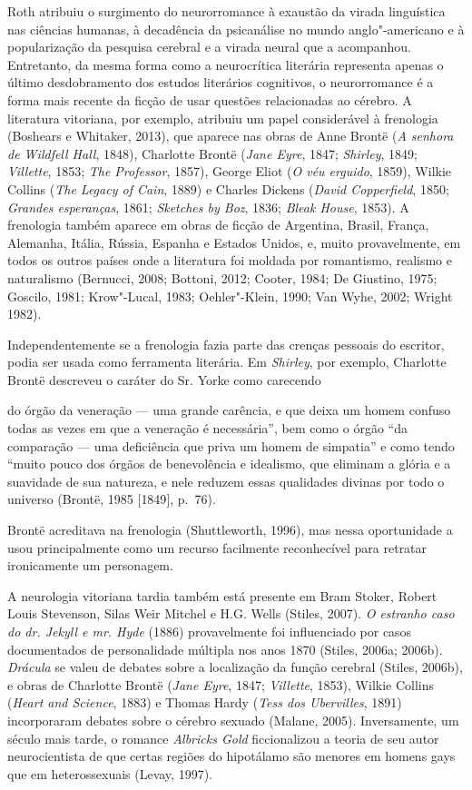 Roth atribuiu o surgimento do neurorromance à exaustão da virada
linguística nas ciências humanas, à decadência da psicanálise no mundo
anglo"-americano e à popularização da pesquisa cerebral e a virada neural
que a acompanhou. Entretanto, da mesma forma como a neurocrítica
literária representa apenas o último desdobramento dos estudos
literários cognitivos, o neurorromance é a forma mais recente da ficção
de usar questões relacionadas ao cérebro. A literatura vitoriana, por
exemplo, atribuiu um papel considerável à frenologia (Boshears e
Whitaker, 2013), que aparece nas obras de Anne Brontë (\emph{A senhora
de Wildfell Hall}, 1848), Charlotte Brontë (\emph{Jane Eyre}, 1847;
\emph{Shirley}, 1849; \emph{Villette}, 1853; \emph{The Professor},
1857), George Eliot (\emph{O véu erguido}, 1859), Wilkie Collins
(\emph{The Legacy of Cain}, 1889) e Charles Dickens (\emph{David
Copperfield}, 1850; \emph{Grandes esperanças}, 1861; \emph{Sketches by
Boz}, 1836; \emph{Bleak House}, 1853). A frenologia também aparece em
obras de ficção de Argentina, Brasil, França, Alemanha, Itália, Rússia,
Espanha e Estados Unidos, e, muito provavelmente, em todos os outros
países onde a literatura foi moldada por romantismo, realismo e
naturalismo (Bernucci, 2008; Bottoni, 2012; Cooter, 1984; De Giustino,
1975; Goscilo, 1981; Krow"-Lucal, 1983; Oehler"-Klein, 1990; Van Wyhe,
2002; Wright 1982).

Independentemente se a frenologia fazia parte das crenças pessoais do
escritor, podia ser usada como ferramenta literária. Em \emph{Shirley},
por exemplo, Charlotte Brontë descreveu o caráter do Sr. Yorke como
carecendo

do órgão da veneração --- uma grande carência, e que deixa um homem
confuso todas as vezes em que a veneração é necessária'', bem como o
órgão ``da comparação --- uma deficiência que priva um homem de
simpatia'' e como tendo ``muito pouco dos órgãos de benevolência e
idealismo, que eliminam a glória e a suavidade de sua natureza, e nele
reduzem essas qualidades divinas por todo o universo (Brontë, 1985
{[}1849{]}, p.~76).

Brontë acreditava na frenologia (Shuttleworth, 1996), mas nessa
oportunidade a usou principalmente como um recurso facilmente
reconhecível para retratar ironicamente um personagem.

A neurologia vitoriana tardia também está presente em Bram Stoker,
Robert Louis Stevenson, Silas Weir Mitchel e H.G. Wells (Stiles, 2007).
\emph{O estranho caso do dr. Jekyll e mr. Hyde} (1886) provavelmente foi
influenciado por casos documentados de personalidade múltipla nos anos
1870 (Stiles, 2006a; 2006b). \emph{Drácula} se valeu de debates sobre a
localização da função cerebral (Stiles, 2006b), e obras de Charlotte
Brontë (\emph{Jane Eyre}, 1847; \emph{Villette}, 1853), Wilkie Collins
(\emph{Heart and Science}, 1883) e Thomas Hardy (\emph{Tess dos
Ubervilles}, 1891) incorporaram debates sobre o cérebro sexuado (Malane,
2005). Inversamente, um século mais tarde, o romance \emph{Albricks
Gold} ficcionalizou a teoria de seu autor neurocientista de que certas
regiões do hipotálamo são menores em homens gays que em heterossexuais
(Levay, 1997).

